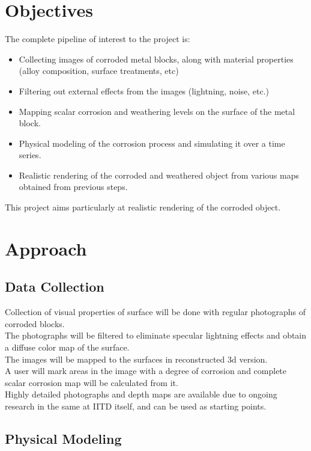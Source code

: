 \documentclass[12pt]{article}
\begin{document}
\section{Objectives}

The complete pipeline of interest to the project is:

\begin{itemize}
\item Collecting images of corroded metal blocks, along with material properties (alloy composition, surface treatments, etc)
\item Filtering out external effects from the images (lightning, noise, etc.)
\item Mapping scalar corrosion and weathering levels on the surface of the metal block.
\item Physical modeling of the corrosion process and simulating it over a time series.
\item Realistic rendering of the corroded and weathered object from various maps obtained from previous steps.
\end{itemize}

This project aims particularly at realistic rendering of the corroded object.

\section{Approach}

\subsection{Data Collection}

Collection of visual properties of surface will be done with regular photographs of corroded blocks.\\
The photographs will be filtered to eliminate specular lightning effects and obtain a diffuse color map of the surface.\\
The images will be mapped to the surfaces in reconstructed 3d version.\\
A user will mark areas in the image with a degree of corrosion and complete scalar corrosion map will be calculated from it.\\

Highly detailed photographs and depth maps are available due to ongoing research in the same at IITD itself, and can be used as starting points.

\subsection{Physical Modeling}
\end{document}
